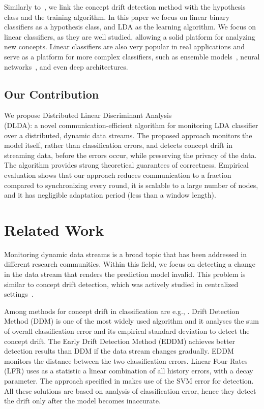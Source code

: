 \documentclass{sig-alternate-05-2015}
\begin{document}
Similarly to~\cite{icml2014c2_harel14}, we link the concept drift detection method with the
hypothesis class and the training algorithm.
In this paper we focus on linear binary classifiers as a hypothesis class, and
LDA \cite{fisher1936use} as the learning algorithm.
We focus on linear classifiers, as they are well studied, allowing a solid platform for analyzing new concepts. Linear classifiers are also very popular in real applications and serve as a platform for more complex classifiers, such as ensemble models~\cite{Deva, eSVM},
neural networks~\cite{osadchy2015k}, and even deep architectures\cite{ROSS}.


\subsection{Our Contribution}
We propose Distributed Linear Discriminant Analysis
\\ (DLDA): a novel communication-efficient algorithm for monitoring LDA classifier over a distributed, dynamic data streams.
The proposed approach monitors the model itself, rather than classification errors,
and detects concept drift in streaming data, before the errors occur, while  preserving the privacy of the data.
The algorithm provides strong theoretical guarantees of correctness.
Empirical evaluation shows that our approach reduces communication to a fraction compared to synchronizing every round, it is scalable to a large number of nodes, and it has negligible adaptation period (less than a window length).


\section{Related Work}
Monitoring dynamic data streams is a broad topic that has been addressed in different research communities. Within this field, we focus on detecting a change in the data stream that renders the prediction model invalid. This problem is similar to concept drift detection, which was actively studied in centralized settings~\cite{basseville1993detection,brodsky2013nonparametric,ChenGupta2000,Tsymbal,Gama2014}.

Among methods for concept drift in classification are e.g., \cite{gama2004learning,baena2006early,klinkenberg2000detecting,dries2009adaptive,icml2014c2_harel14,AngGZPH13}. Drift Detection Method (DDM) \cite{gama2004learning} is one of the most widely used algorithm and it analyses the sum of overall classification error and its empirical standard deviation to detect the concept drift.
The Early Drift Detection Method (EDDM) \cite{baena2006early} achieves better detection results than DDM if the data stream changes gradually. EDDM monitors the distance between the two classification errors.
Linear Four Rates (LFR) \cite{wang2015concept} uses as a statistic a linear combination of all history errors, with a decay parameter. The approach specified in \cite{klinkenberg2000detecting,dries2009adaptive} makes use of
the SVM error for detection. All these solutions are based on analysis of classification error, hence they detect the drift only after the model becomes inaccurate.
\end{document}
